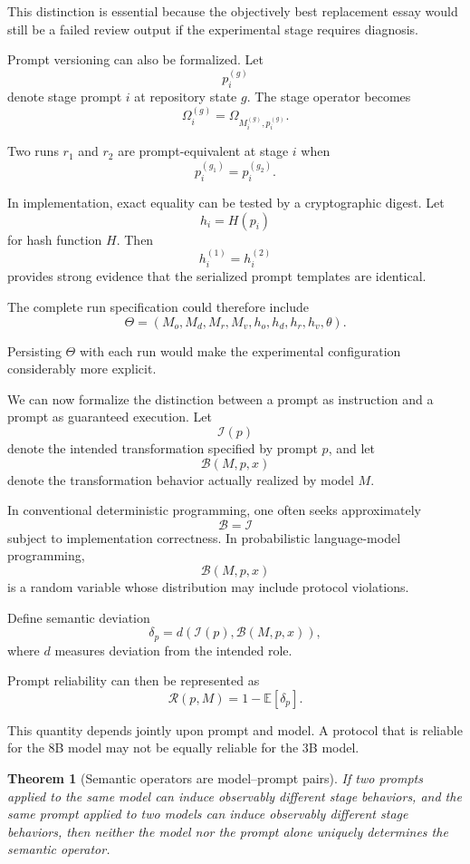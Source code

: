 \documentclass[11pt]{article}
\newtheorem{theorem}[definition]{Theorem}
\begin{document}
This distinction is essential because the objectively best replacement essay would still be a failed review output if the experimental stage requires diagnosis.

Prompt versioning can also be formalized. Let
\[
    p_i^{(g)}
\]
denote stage prompt \(i\) at repository state \(g\). The stage operator becomes
\[
    \Omega_i^{(g)}
    =
    \Omega_{M_i^{(g)},p_i^{(g)}}.
\]

Two runs \(r_1\) and \(r_2\) are prompt-equivalent at stage \(i\) when
\[
    p_i^{(g_1)}=p_i^{(g_2)}.
\]

In implementation, exact equality can be tested by a cryptographic digest. Let
\[
    h_i
    =
    H(p_i)
\]
for hash function \(H\). Then
\[
    h_i^{(1)}=h_i^{(2)}
\]
provides strong evidence that the serialized prompt templates are identical.

The complete run specification could therefore include
\[
    \Theta
    =
    \left(
        M_o,M_d,M_r,M_v,
        h_o,h_d,h_r,h_v,
        \theta
    \right).
\]

Persisting \(\Theta\) with each run would make the experimental configuration considerably more explicit.

We can now formalize the distinction between a prompt as instruction and a prompt as guaranteed execution. Let
\[
    \mathcal{I}(p)
\]
denote the intended transformation specified by prompt \(p\), and let
\[
    \mathcal{B}(M,p,x)
\]
denote the transformation behavior actually realized by model \(M\).

In conventional deterministic programming, one often seeks approximately
\[
    \mathcal{B}=\mathcal{I}
\]
subject to implementation correctness. In probabilistic language-model programming,
\[
    \mathcal{B}(M,p,x)
\]
is a random variable whose distribution may include protocol violations.

Define semantic deviation
\[
    \delta_p
    =
    d
    \left(
        \mathcal{I}(p),
        \mathcal{B}(M,p,x)
    \right),
\]
where \(d\) measures deviation from the intended role.

Prompt reliability can then be represented as
\[
    \mathcal{R}(p,M)
    =
    1-
    \mathbb{E}[\delta_p].
\]

This quantity depends jointly upon prompt and model. A protocol that is reliable for the 8B model may not be equally reliable for the 3B model.

\begin{theorem}[Semantic operators are model--prompt pairs]
If two prompts applied to the same model can induce observably different stage behaviors, and the same prompt applied to two models can induce observably different stage behaviors, then neither the model nor the prompt alone uniquely determines the semantic operator.
\end{theorem}
\end{document}
